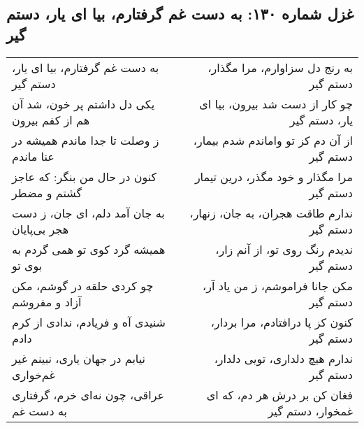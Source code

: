 \begin{center}
\section*{غزل شماره ۱۳۰: به دست غم گرفتارم، بیا ای یار، دستم گیر}
\label{sec:130}
\begin{longtable}{l p{0.5cm} r}
به دست غم گرفتارم، بیا ای یار، دستم گیر
&&
به رنج دل سزاوارم، مرا مگذار، دستم گیر
\\
یکی دل داشتم پر خون، شد آن هم از کفم بیرون
&&
چو کار از دست شد بیرون، بیا ای یار، دستم گیر
\\
ز وصلت تا جدا ماندم همیشه در عنا ماندم
&&
از آن دم کز تو واماندم شدم بیمار، دستم گیر
\\
کنون در حال من بنگر: که عاجز گشتم و مضطر
&&
مرا مگذار و خود مگذر، درین تیمار دستم گیر
\\
به جان آمد دلم، ای جان، ز دست هجر بی‌پایان
&&
ندارم طاقت هجران، به جان، زنهار، دستم گیر
\\
همیشه گرد کوی تو همی گردم به بوی تو
&&
ندیدم رنگ روی تو، از آنم زار، دستم گیر
\\
چو کردی حلقه در گوشم، مکن آزاد و مفروشم
&&
مکن جانا فراموشم، ز من یاد آر، دستم گیر
\\
شنیدی آه و فریادم، ندادی از کرم دادم
&&
کنون کز پا درافتادم، مرا بردار، دستم گیر
\\
نیابم در جهان یاری، نبینم غیر غم‌خواری
&&
ندارم هیچ دلداری، تویی دلدار، دستم گیر
\\
عراقی، چون نه‌ای خرم، گرفتاری به دست غم
&&
فغان کن بر درش هر دم، که ای غمخوار، دستم گیر
\\
\end{longtable}
\end{center}
